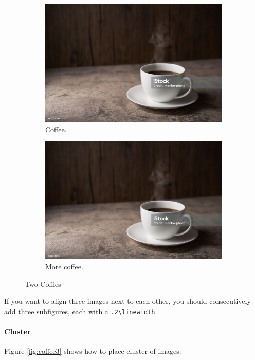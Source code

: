 \documentclass{report}[a4paper,12pt] %
\begin{document}
\begin{figure}[h!]
  \centering
  \begin{subfigure}[b]{0.4\linewidth}
    \includegraphics[width=\linewidth]{coffee.jpg}
    \caption{Coffee.}
  \end{subfigure}
  \begin{subfigure}[b]{0.4\linewidth}
    \includegraphics[width=\linewidth]{coffee.jpg}
    \caption{More coffee.}
  \end{subfigure}
  \caption{Two Coffies}
  \label{fig:coffee}
\end{figure}

If you want to align three images next to each other,
you should consecutively add three subfigures, each with a \verb|.2\linewidth|


\paragraph{Cluster}
Figure \ref{fig:coffee3} shows how to place cluster of images.
\end{document}
